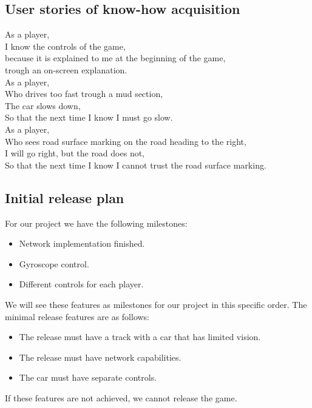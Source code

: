 \documentclass[11pt,twoside,a4paper]{article}
\begin{document}
\subsection{User stories of know-how acquisition}
As a player,\\
I know the controls of the game,\\
because it is explained to me at the beginning of the game,\\
trough an on-screen explanation.\\

As a player,\\
Who drives too fast trough a mud section,\\
The car slows down,\\
So that the next time I know I must go slow.\\

As a player,\\
Who sees road surface marking on the road heading to the right,\\
I will go right, but the road does not,\\
So that the next time I know I cannot trust the road surface marking.\\


\subsection{Initial release plan}
For our project we have the following milestones:

\begin{itemize}
  \item Network implementation finished.
  \item Gyroscope control.
  \item Different controls for each player.
\end{itemize}

We will see these features as milestones for our project in this specific order. The minimal release features are as follows:

\begin{itemize}
  \item The release must have a track with a car that has limited vision.
  \item The release must have network capabilities.
  \item The car must have separate controls.
\end{itemize}

If these features are not achieved, we cannot release the game.
\end{document}
